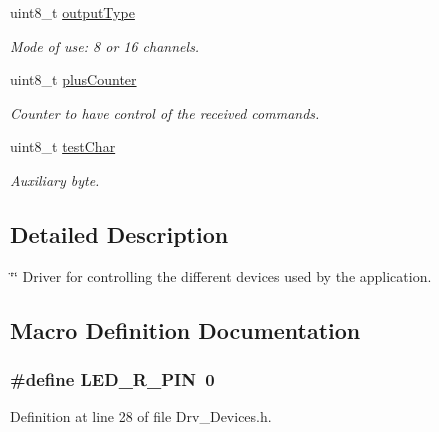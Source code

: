 \begin{DoxyCompactItemize}
uint8\+\_\+t \hyperlink{group__Devices__Library_ga2bc20b2f7f3efa988afcd5c19b3e2edf}{output\+Type}
\begin{DoxyCompactList}\small\item\em Mode of use\+: 8 or 16 channels. \end{DoxyCompactList}\item 
uint8\+\_\+t \hyperlink{group__Devices__Library_gac011c12f1d5ab04cb87b6edaec1d24ad}{plus\+Counter}
\begin{DoxyCompactList}\small\item\em Counter to have control of the received commands. \end{DoxyCompactList}\item 
uint8\+\_\+t \hyperlink{group__Devices__Library_gae004df3f2b77e4d58eee171d2f76da40}{test\+Char}
\begin{DoxyCompactList}\small\item\em Auxiliary byte. \end{DoxyCompactList}\end{DoxyCompactItemize}


\subsection{Detailed Description}
\char`\"{}\char`\"{} Driver for controlling the different devices used by the application. 

\subsection{Macro Definition Documentation}
\subsubsection[{\texorpdfstring{L\+E\+D\+\_\+\+R\+\_\+\+P\+IN}{LED_R_PIN}}]{\setlength{\rightskip}{0pt plus 5cm}\#define L\+E\+D\+\_\+\+R\+\_\+\+P\+IN~0}\hypertarget{group__Devices__Library_ga22f3cf4ef9dadad8d78d5c59999100b6}{}\label{group__Devices__Library_ga22f3cf4ef9dadad8d78d5c59999100b6}


Definition at line 28 of file Drv\+\_\+\+Devices.\+h.

